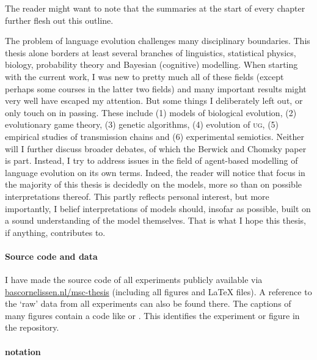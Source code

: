 \documentclass{../src/bcthesispart}
\begin{document}
The reader might want to note that the summaries at the start of every chapter further flesh out this outline.



The problem of language evolution challenges many disciplinary boundaries.
This thesis alone borders at least several branches of linguistics, statistical physics, biology, probability theory and Bayesian (cognitive) modelling.
When starting with the current work, I was new to pretty much all of these fields (except perhaps some courses in the latter two fields) and many important results might very well have escaped my attention. 
But some things I deliberately left out, or only touch on in passing.
These include (1) models of biological evolution, (2) evolutionary game theory, (3) genetic algorithms, (4) evolution of \textsc{ug}, (5) empirical studies of transmission chains and (6) experimental semiotics.
Neither will I further discuss broader debates, of which the Berwick and Chomsky paper is part.
Instead, I try to address issues in the field of agent-based modelling of language evolution on its own terms.
Indeed, the reader will notice that focus in the majority of this thesis is decidedly on the models, more so than on possible interpretations thereof.
This partly reflects personal interest, but more importantly, I belief interpretations of models should, insofar as possible, built on a sound understanding of the model themselves.
That is what I hope this thesis, if anything, contributes to.





\paragraph{Source code and data}

I have made the source code of all experiments publicly available via \href{http://bascornelissen.nl/msc-thesis/}{bascornelissen.nl/msc-thesis} (including all figures and LaTeX files).
A reference to the ‘raw’ data from all experiments can also be found there.
The captions of many figures contain a code like  or .
This identifies the experiment or figure in the repository.




\paragraph{notation}
\end{document}

